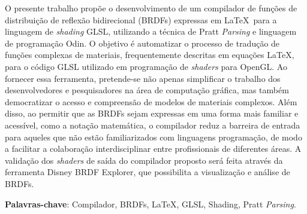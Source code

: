 \setlength{\absparsep}{18pt} %
\begin{resumo}
 


  O presente trabalho propõe o desenvolvimento de um compilador de funções de distribuição de reflexão bidirecional (BRDFs) expressas em \LaTeX\  para a linguagem de \textit{shading} GLSL, utilizando a técnica de Pratt \textit{Parsing} e linguagem de programação Odin. O objetivo é automatizar o processo de tradução de funções complexas de materiais, frequentemente descritas em equações \LaTeX, para o código GLSL utilizado em programação de \textit{shaders} para OpenGL. Ao fornecer essa ferramenta, pretende-se não apenas simplificar o trabalho dos desenvolvedores e pesquisadores na área de computação gráfica, mas também democratizar o acesso e compreensão de modelos de materiais complexos. Além disso, ao permitir que as BRDFs sejam expressas em uma forma mais familiar e acessível, como a notação matemática, o compilador reduz a barreira de entrada para aqueles que não estão familiarizados com linguagens programação, de modo a facilitar a colaboração interdisciplinar entre profissionais de diferentes áreas. A validação dos \textit{shaders} de saída do compilador proposto será feita através da ferramenta Disney BRDF Explorer, que possibilita a visualização e análise de BRDFs. 

  \textbf{Palavras-chave}: Compilador, BRDFs, LaTeX, GLSL, Shading, Pratt \textit{Parsing}.
\end{resumo}
